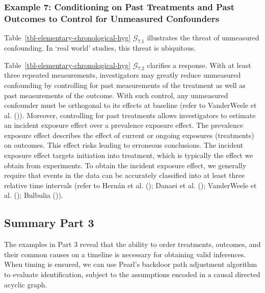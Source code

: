 \documentclass[
  single column]{article}
\begin{document}
\subsubsection{Example 7: Conditioning on Past Treatments and Past
Outcomes to Control for Unmeasured
Confounders}\label{example-7-conditioning-on-past-treatments-and-past-outcomes-to-control-for-unmeasured-confounders}

Table~\ref{tbl-elementary-chronological-hyg} \(\mathcal{G}_{7.1}\)
illustrates the threat of unmeasured confounding. In `real world'
studies, this threat is ubiquitous.

Table~\ref{tbl-elementary-chronological-hyg} \(\mathcal{G}_{7.2}\)
clarifies a response. With at least three repeated measurements,
investigators may greatly reduce unmeasured confounding by controlling
for past measurements of the treatment as well as past measurements of
the outcome. With such control, any unmeasured confounder must be
orthogonal to its effects at baseline (refer to VanderWeele et al.
()). Moreover, controlling for past
treatments allows investigators to estimate an incident exposure effect
over a prevalence exposure effect. The prevalence exposure effect
describes the effect of current or ongoing exposures (treatments) on
outcomes. This effect risks leading to erroneous conclusions. The
incident exposure effect targets initiation into treatment, which is
typically the effect we obtain from experiments. To obtain the incident
exposure effect, we generally require that events in the data can be
accurately classified into at least three relative time intervals (refer
to Hernán et al. (); Danaei et al.
(); VanderWeele et al.
(); Bulbulia
()).

\subsection{Summary Part 3}\label{summary-part-3}

The examples in Part 3 reveal that the ability to order treatments,
outcomes, and their common causes on a timeline is necessary for
obtaining valid inferences. When timing is ensured, we can use Pearl's
backdoor path adjustment algorithm to evaluate identification, subject
to the assumptions encoded in a causal directed acyclic graph.

\newpage{}
\end{document}
